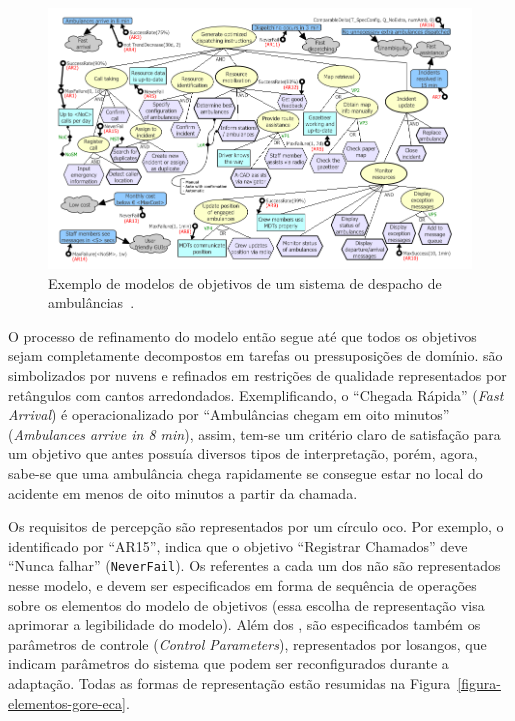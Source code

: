 \begin{figure}
	\centering
	\includegraphics[width=1\textwidth]{figuras/modelos/ACAD-Completo.png}
	\caption{Exemplo de modelos de objetivos de um sistema de despacho de ambulâncias~\cite{tesevitor}.}
	\label{figura-acad-completo}
\end{figure}

O processo de refinamento do modelo então segue até que todos os objetivos sejam completamente decompostos em tarefas ou pressuposições de domínio. \sofgoals são simbolizados por nuvens e refinados em restrições de qualidade representados por retângulos com cantos arredondados. Exemplificando, o \sofgoal ``Chegada Rápida'' (\textit{Fast Arrival}) é operacionalizado por ``Ambulâncias chegam em oito minutos'' (\textit{Ambulances arrive in 8 min}), assim, tem-se um critério claro de satisfação para um objetivo que antes possuía diversos tipos de interpretação, porém, agora, sabe-se que uma ambulância chega rapidamente se consegue estar no local do acidente em menos de oito minutos a partir da chamada.

Os requisitos de percepção são representados por um círculo oco. Por exemplo, o \awreq identificado por ``AR15'', indica que o objetivo ``Registrar Chamados'' deve ``Nunca falhar'' (\texttt{NeverFail}). Os \evoreqs referentes a cada um dos \awreqs não são representados nesse modelo, e devem ser especificados em forma de sequência de operações sobre os elementos do modelo de objetivos (essa escolha de representação visa aprimorar a legibilidade do modelo). Além dos \awreqs, são especificados também os parâmetros de controle (\textit{Control Parameters}), representados por losangos, que indicam parâmetros do sistema que podem ser reconfigurados durante a adaptação. Todas as formas de representação estão resumidas na Figura~\ref{figura-elementos-gore-eca}.

